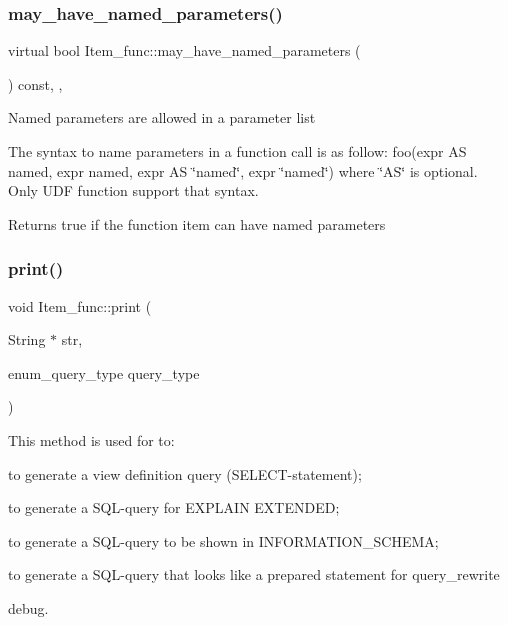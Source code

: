 \mbox{\label{classItem__func_a8327a37c4f343c168f7ce76efa23a243}} 
\subsubsection{\texorpdfstring{may\+\_\+have\+\_\+named\+\_\+parameters()}{may\_have\_named\_parameters()}}
{\footnotesize\ttfamily virtual bool Item\+\_\+func\+::may\+\_\+have\+\_\+named\+\_\+parameters (\begin{DoxyParamCaption}{ }\end{DoxyParamCaption}) const\hspace{0.3cm}{\ttfamily [inline]}, {\ttfamily [protected]}, {\ttfamily [virtual]}}

Named parameters are allowed in a parameter list

The syntax to name parameters in a function call is as follow\+: {\ttfamily foo(expr AS named, expr named, expr AS \char`\"{}named\char`\"{}, expr \char`\"{}named\char`\"{})} where \char`\"{}\+A\+S\char`\"{} is optional. Only U\+DF function support that syntax.

\begin{DoxyReturn}{Returns}
true if the function item can have named parameters 
\end{DoxyReturn}
\mbox{\label{classItem__func_afb302ee25d4721ace27d3f5053d4ee41}} 
\subsubsection{\texorpdfstring{print()}{print()}}
{\footnotesize\ttfamily void Item\+\_\+func\+::print (\begin{DoxyParamCaption}\item[{String $\ast$}]{str,  }\item[{enum\+\_\+query\+\_\+type}]{query\+\_\+type }\end{DoxyParamCaption})\hspace{0.3cm}{\ttfamily [virtual]}}

This method is used for to\+:
\begin{DoxyItemize}
\item to generate a view definition query (S\+E\+L\+E\+CT-\/statement);
\item to generate a S\+QL-\/query for E\+X\+P\+L\+A\+IN E\+X\+T\+E\+N\+D\+ED;
\item to generate a S\+QL-\/query to be shown in I\+N\+F\+O\+R\+M\+A\+T\+I\+O\+N\+\_\+\+S\+C\+H\+E\+MA;
\item to generate a S\+QL-\/query that looks like a prepared statement for query\+\_\+rewrite
\item debug.
\end{DoxyItemize}


